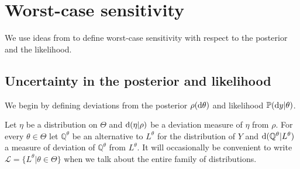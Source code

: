 \documentclass[11pt,reqno,letter]{amsart}
\theoremstyle{plain}
\theoremstyle{definition}
\numberwithin{equation}{section}
\numberwithin{theorem}{section}
\numberwithin{table}{section}
\numberwithin{figure}{section}
\begin{document}

\section{Worst-case sensitivity} 
\label{sec:WCS}

We use ideas from \cite{gotoh2026sensitivity} to define worst-case sensitivity with respect to the posterior and the likelihood.  


\subsection{Uncertainty in the posterior and likelihood}

We begin by defining deviations from the posterior $\rho({\rm d}\theta)$ and likelihood ${\mathbb P}({\rm d}y | \theta)$. 

Let $\eta$ be a distribution  on $\Theta$  and ${\rm d}( \eta | \rho)$ be a deviation measure of $\eta$ from $\rho$. For every $\theta\in\Theta$ let ${\mathbb Q}^\theta$ be an alternative to $L^\theta$ for the distribution of  $Y$ and ${\rm d}({\mathbb Q}^\theta| L^\theta)$ a measure of deviation of ${\mathbb Q}^\theta$ from $L^\theta$. It will occasionally be convenient to write ${\mathcal L} = \{ L^\theta| \theta\in\Theta\}$ when we talk about the entire family of distributions.

\end{document}
